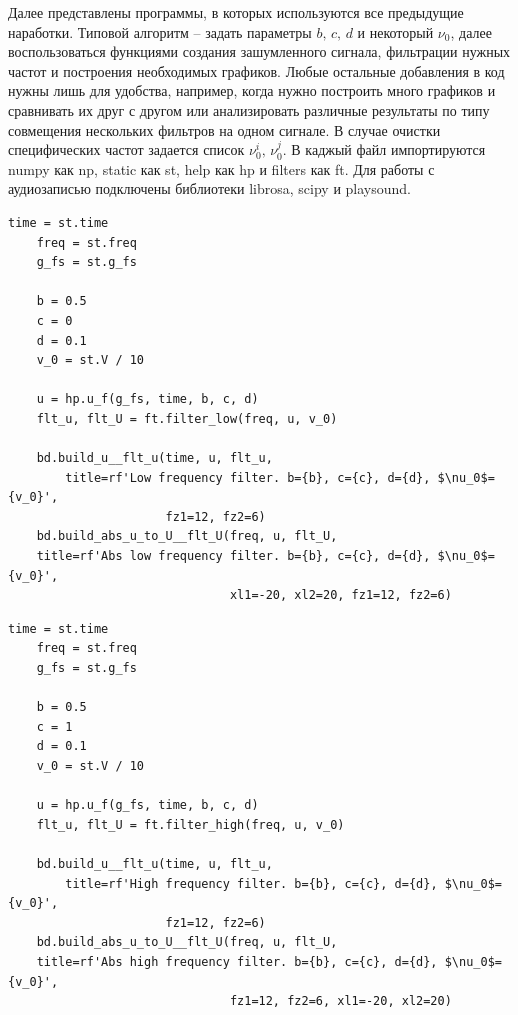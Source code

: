 \documentclass[a4paper, 12pt]{article}
\begin{document}
    Далее представлены программы, в которых используются все предыдущие наработки. Типовой алгоритм -- задать
    параметры $b,\,c,\,d$ и некоторый $\nu_0$, далее воспользоваться функциями создания зашумленного сигнала,
    фильтрации нужных частот и построения необходимых графиков. Любые остальные добавления в код нужны лишь
    для удобства, например, когда нужно построить много графиков и сравнивать их друг с другом или анализировать
    различные результаты по типу совмещения нескольких фильтров на одном сигнале. В случае очистки специфических
    частот задается список $\nu_{0}^{i},\,\nu_{0}^{j}$. В каджый файл импортируются numpy как np, static как st,
    help как hp и filters как ft. Для работы с аудиозаписью подключены библиотеки librosa, scipy и playsound.


    \begin{lstlisting}[label=l5, caption={Файл nohigh.py. Фильтрация нижних частот.}]
    time = st.time
    freq = st.freq
    g_fs = st.g_fs
        
    b = 0.5
    c = 0
    d = 0.1
    v_0 = st.V / 10
        
    u = hp.u_f(g_fs, time, b, c, d)
    flt_u, flt_U = ft.filter_low(freq, u, v_0)
        
    bd.build_u__flt_u(time, u, flt_u,
        title=rf'Low frequency filter. b={b}, c={c}, d={d}, $\nu_0$={v_0}',
                      fz1=12, fz2=6)
    bd.build_abs_u_to_U__flt_U(freq, u, flt_U,
    title=rf'Abs low frequency filter. b={b}, c={c}, d={d}, $\nu_0$={v_0}',
                               xl1=-20, xl2=20, fz1=12, fz2=6)
    \end{lstlisting}
    \begin{lstlisting}[label=l6, caption={Файл nolow.py. Фильтрация верхних частот.}]
    time = st.time
    freq = st.freq
    g_fs = st.g_fs
    
    b = 0.5
    c = 1
    d = 0.1
    v_0 = st.V / 10
    
    u = hp.u_f(g_fs, time, b, c, d)
    flt_u, flt_U = ft.filter_high(freq, u, v_0)
    
    bd.build_u__flt_u(time, u, flt_u,
        title=rf'High frequency filter. b={b}, c={c}, d={d}, $\nu_0$={v_0}',
                      fz1=12, fz2=6)
    bd.build_abs_u_to_U__flt_U(freq, u, flt_U,
    title=rf'Abs high frequency filter. b={b}, c={c}, d={d}, $\nu_0$={v_0}',
                               fz1=12, fz2=6, xl1=-20, xl2=20)
    \end{lstlisting}
\end{document}
